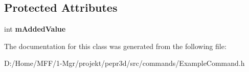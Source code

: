 \subsection*{Protected Attributes}
\begin{DoxyCompactItemize}
\item 
\mbox{\label{classpepr3d_1_1_add_value_command_a337304dc83c224cfc9c28d735bff883b}} 
int {\bfseries m\+Added\+Value}
\end{DoxyCompactItemize}


The documentation for this class was generated from the following file\+:\begin{DoxyCompactItemize}
\item 
D\+:/\+Home/\+M\+F\+F/1-\/\+Mgr/projekt/pepr3d/src/commands/Example\+Command.\+h\end{DoxyCompactItemize}
